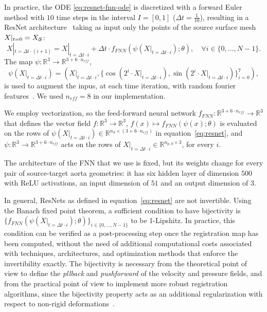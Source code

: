 In practice, the ODE \eqref{eq:resnet-fnn-ode} is discretized with a forward Euler method with $10$ time steps in the interval $I=[0,1]$ ($\Delta t = \frac{1}{10}$), resulting in a ResNet architecture~\cite{amor2022resnet} taking as input only the points of the source surface mesh $X|_{t=0}=X_{\mathcal S}$:
\begin{equation}
  \label{eq:resnet}
  X|_{t=\Delta t\cdot (i+1)} = X|_{t=\Delta t\cdot i} + \Delta t\cdot f_{FNN}(\psi(X|_{t=\Delta t\cdot i});\theta),\quad \forall i\in\{0, \dots, N-1\}.
\end{equation} 
The map  $\psi:\mathbb{R}^3\rightarrow\mathbb{R}^{3+6\cdot n_{rff}}$, 
\begin{equation*}
  \psi(X|_{t=\Delta t\cdot i}) = (X|_{t=\Delta t\cdot i}, \{\cos(2^i\cdot X|_{t=\Delta t\cdot i}), \sin(2^i\cdot X|_{t=\Delta t\cdot i})\}_{i=0}^{7}),
\end{equation*}
is used to augment the inpus,  at each time iteration, with random fourier features~\cite{tancik2020fourier}. We used $n_{rff}=8$ in our implementation.

We employ vectorization, so the feed-forward neural network $f_{FNN}:\mathbb{R}^{3+6\cdot n_{rff}}\rightarrow\mathbb{R}^3$ that defines the vector field $f:\mathbb{R}^3\rightarrow\mathbb{R}^3$, $f(x)\mapsto f_{FNN}(\psi(x); \theta)$ is evaluated on the rows of $\psi(X|_{t=\Delta t\cdot i})\in\mathbb{R}^{n_S\times (3+6\cdot n_{rff})}$ in equation~\eqref{eq:resnet}, and $\psi:\mathbb{R}^3\rightarrow\mathbb{R}^{3+6\cdot n_{rff}}$ acts on the rows of $X|_{t=\Delta t\cdot i}\in\mathbb{R}^{n_{p, S}\times 3}$, for every $i$. 

The architecture of the FNN that we use is fixed, but its weights change for every pair of source-target aorta geometries: it has six hidden layer of dimension $500$ with ReLU activations, an input dimension of $51$ and an output dimension of $3$.

\begin{rmk}
In general, ResNets as defined in equation~\eqref{eq:resnet} are not invertible. 
  Using the Banach fixed point theorem, a sufficient condition to have bijectivity is 
  $\{f_{FNN}(\psi(X|_{t=\Delta t\cdot i});\theta)\}_{i\in\{0, \dots, N-1\}}$ to be 1-Lipshitz. 
  In practice, this condition can be verified as a post-processing step once the registration map has been computed, without the need of 
  additional computational costs associated with techniques, architectures, and optimization methods that enforce the invertibility exactly. The bijectivity is necessary from the theoretical point of view to define the \textit{pllback} and \textit{pushforward} of the velocity and pressure fields, and from the practical point of view to implement more robust registration algorithms, since the bijectivity property acts as an additional regularization with respect to non-rigid deformations~\cite{scarpolini2023enabling}.
\end{rmk}

